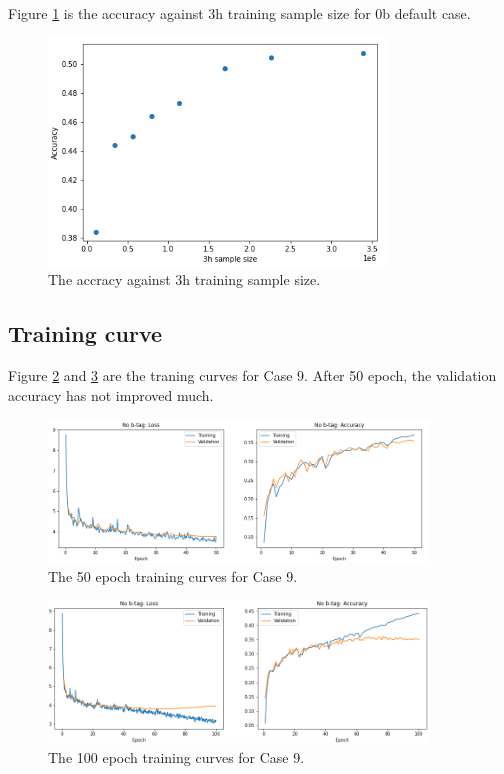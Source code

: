 \documentclass[12pt]{article}
\begin{document}
		Figure \ref{fig:accuracy_training_sample_size} is the accuracy against 3h training sample size for 0b default case. 
		\begin{figure}[htpb]
			\centering
			\includegraphics[width=0.8\textwidth]{accuracy_training_sample_size.png}
			\caption{The accracy against 3h training sample size.}
			\label{fig:accuracy_training_sample_size}
		\end{figure}

	\subsection{Training curve}%
	\label{sub:training_curve}
		Figure \ref{fig:loss_and_accuracy_curve_no_btag_50_ep} and \ref{fig:loss_and_accuracy_curve_no_btag_100_ep} are the traning curves for Case 9. After 50 epoch, the validation accuracy has not improved much.
		\begin{figure}[htpb]
			\centering
			\includegraphics[width=0.9\textwidth]{loss_and_accuracy_curve_no_btag.png}
			\caption{The 50 epoch training curves for Case 9.}
			\label{fig:loss_and_accuracy_curve_no_btag_50_ep}
		\end{figure}

		\begin{figure}[htpb]
			\centering
			\includegraphics[width=0.9\textwidth]{loss_and_accuracy_curve_no_btag_100_ep.png}
			\caption{The 100 epoch training curves for Case 9.}
			\label{fig:loss_and_accuracy_curve_no_btag_100_ep}
		\end{figure}
\end{document}
